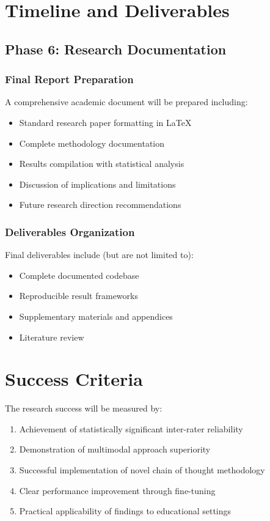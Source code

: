 \documentclass[12pt]{article}
\begin{document}
\section{Timeline and Deliverables}

\subsection{Phase 6: Research Documentation}

\subsubsection{Final Report Preparation}
A comprehensive academic document will be prepared including:
\begin{itemize}
    \item Standard research paper formatting in \LaTeX
    \item Complete methodology documentation
    \item Results compilation with statistical analysis
    \item Discussion of implications and limitations
    \item Future research direction recommendations
\end{itemize}

\subsubsection{Deliverables Organization}
Final deliverables include (but are not limited to):
\begin{itemize}
    \item Complete documented codebase
    \item Reproducible result frameworks
    \item Supplementary materials and appendices
    \item Literature review
\end{itemize}

\section{Success Criteria}

The research success will be measured by:
\begin{enumerate}
    \item Achievement of statistically significant inter-rater reliability
    \item Demonstration of multimodal approach superiority
    \item Successful implementation of novel chain of thought methodology
    \item Clear performance improvement through fine-tuning
    \item Practical applicability of findings to educational settings
\end{enumerate}
\end{document}
